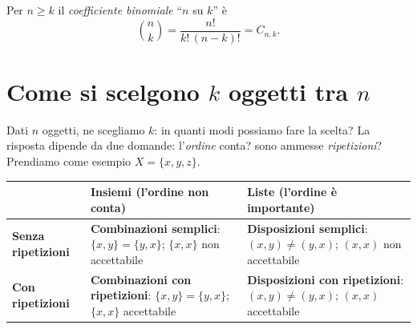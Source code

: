 \documentclass[11pt,a4paper]{article}
\begin{document}
\begin{definizione}
Per $n \geq k$ il \emph{coefficiente binomiale} ``$n$ su $k$'' è
\[
\binom{n}{k} = \frac{n!}{k!\,(n-k)!} = C_{n,k}.
\]
\end{definizione}

\section{Come si scelgono $k$ oggetti tra $n$}

Dati $n$ oggetti, ne scegliamo $k$: in quanti modi possiamo fare la scelta? La risposta dipende da due domande: l'\emph{ordine} conta? sono ammesse \emph{ripetizioni}? Prendiamo come esempio $X = \{x, y, z\}$.

\begin{center}
\renewcommand{\arraystretch}{1.4}
\begin{tabular}{@{}l|p{5.2cm}|p{5.2cm}@{}}
 & \textbf{Insiemi} (l'ordine non conta) & \textbf{Liste} (l'ordine è importante) \\ \midrule
\textbf{Senza ripetizioni}
 & \textbf{Combinazioni semplici}: $\{x,y\} = \{y,x\}$; $\{x,x\}$ non accettabile
 & \textbf{Disposizioni semplici}: $(x,y) \neq (y,x)$; $(x,x)$ non accettabile \\ \midrule
\textbf{Con ripetizioni}
 & \textbf{Combinazioni con ripetizioni}: $\{x,y\} = \{y,x\}$; $\{x,x\}$ accettabile
 & \textbf{Disposizioni con ripetizioni}: $(x,y) \neq (y,x)$; $(x,x)$ accettabile
\end{tabular}
\end{center}
\end{document}
